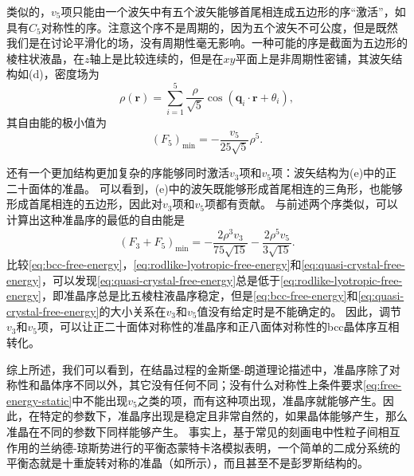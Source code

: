 \documentclass[hyperref, UTF8, a4paper]{ctexart}
\begin{document}
类似的，$v_5$项只能由一个波矢中有五个波矢能够首尾相连成五边形的序“激活”，如具有$C_5$对称性的序。注意这个序不是周期的，因为五个波矢不可公度，但是既然我们是在讨论平滑化的场，没有周期性毫无影响。一种可能的序是截面为五边形的棱柱状液晶，在$z$轴上是比较连续的，但是在$xy$平面上是非周期性密铺，其波矢结构如(d)，密度场为
\begin{equation}
    \rho(\boldsymbol{r})=\sum_{i=1}^{5} \frac{\rho}{\sqrt{5}} \cos \left(\boldsymbol{q}_{i} \cdot \boldsymbol{r}+\theta_{i}\right),
\end{equation}
其自由能的极小值为
\begin{equation}
    (F_{5})_\text{min} =-\frac{v_{5}}{25 \sqrt{5}} \rho^{5}.
    \label{eq:rodlike-lyotropic-free-energy}
\end{equation}

还有一个更加结构更加复杂的序能够同时激活$v_3$项和$v_5$项：波矢结构为(e)中的正二十面体的准晶。
可以看到，(e)中的波矢既能够形成首尾相连的三角形，也能够形成首尾相连的五边形，因此对$v_3$项和$v_5$项都有贡献。
与前述两个序类似，可以计算出这种准晶序的最低的自由能是
\begin{equation}
    \left(F_{3}+F_{5}\right)_{\min }=-\frac{2 \rho^{3} v_{3}}{75 \sqrt{15}}-\frac{2 \rho^{5} v_{5}}{3 \sqrt{15}}.
    \label{eq:quasi-crystal-free-energy}
\end{equation}
比较\eqref{eq:bcc-free-energy}，\eqref{eq:rodlike-lyotropic-free-energy}和\eqref{eq:quasi-crystal-free-energy}，可以发现\eqref{eq:quasi-crystal-free-energy}总是低于\eqref{eq:rodlike-lyotropic-free-energy}，即准晶序总是比五棱柱液晶序稳定，但是\eqref{eq:bcc-free-energy}和\eqref{eq:quasi-crystal-free-energy}的大小关系在$v_3$和$v_5$值没有给定时是不能确定的。
因此，调节$v_3$和$v_5$项，可以让正二十面体对称性的准晶序和正八面体对称性的bcc晶体序互相转化。

综上所述，我们可以看到，在结晶过程的金斯堡-朗道理论描述中，准晶序除了对称性和晶体序不同以外，其它没有任何不同；没有什么对称性上条件要求\eqref{eq:free-energy-static}中不能出现$v_5$之类的项，而有这种项出现，准晶序就能够产生。因此，在特定的参数下，准晶序出现是稳定且非常自然的，如果晶体能够产生，那么准晶在不同的参数下同样能够产生。
事实上，基于常见的刻画电中性粒子间相互作用的兰纳德-琼斯势进行的平衡态蒙特卡洛模拟表明，一个简单的二成分系统的平衡态就是十重旋转对称的准晶（如所示），而且甚至不是彭罗斯结构的\cite{PhysRevLett.58.706}。
\end{document}
